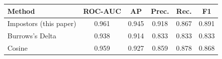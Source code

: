 \begin{tabular}{lccccc}
\toprule
Method & ROC-AUC & AP & Prec. & Rec. & F1 \\
\midrule
Impostors (this paper) & 0.961 & 0.945 & 0.918 & 0.867 & 0.891 \\
Burrows's Delta & 0.938 & 0.914 & 0.833 & 0.833 & 0.833 \\
Cosine & 0.959 & 0.927 & 0.859 & 0.878 & 0.868 \\
\bottomrule
\end{tabular}
